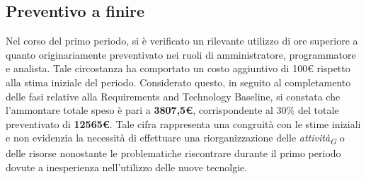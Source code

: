 \subsection{Preventivo a finire}
Nel corso del primo periodo, si è verificato un rilevante utilizzo di ore superiore a quanto originariamente preventivato nei ruoli di amministratore, programmatore e analista. Tale circostanza ha comportato un costo aggiuntivo di 100€ rispetto alla stima iniziale del periodo.
Considerato questo, in seguito al completamento delle fasi relative alla Requirements and Technology Baseline, si constata che l'ammontare totale speso è pari a \textbf{3807,5€}, corrispondente al 30\% del totale preventivato di \textbf{12565€}.
Tale cifra rappresenta una congruità con le stime iniziali e non evidenzia la necessità di effettuare una riorganizzazione delle \textit{attività}\textsubscript{\textit{G}} o delle risorse nonostante le problematiche riscontrare durante il primo periodo dovute a inesperienza nell'utilizzo delle nuove tecnolgie.